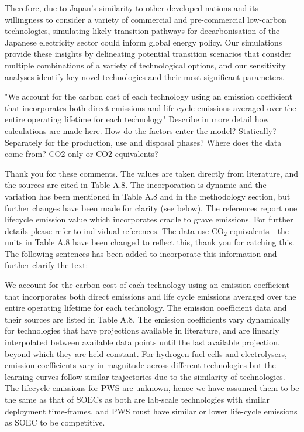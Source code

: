 \documentclass[answers,11pt]{exam}
\begin{document}
\begin{questions}
\begin{solution}
                Therefore, due to Japan's similarity to other developed nations and its willingness to consider a variety of commercial and pre-commercial low-carbon technologies, simulating likely transition pathways for decarbonisation of the Japanese electricity sector could inform global energy policy. Our simulations provide these insights by delineating potential transition scenarios that consider multiple combinations of a variety of technological options, and our sensitivity analyses identify key novel technologies and their most significant parameters.
        \end{solution}	
        
        
         \question "We account for the carbon cost of each technology using an emission coefficient that incorporates both direct emissions and life cycle emissions averaged over the entire operating lifetime for each technology"	
         Describe in more detail how calculations are made here. How do the factors enter the model? Statically? Separately for the production, use and disposal phases? Where does the data come from? CO2 only or CO2 equivalents? 
        
        \begin{solution}
                Thank you for these comments. The values are taken directly from literature, and the sources are cited in Table A.8. The incorporation is dynamic and the variation has been mentioned in Table A.8 and in the methodology section, but further changes have been made for clarity (see below). The references report one lifecycle emission value which incorporates cradle to grave emissions. For further details please refer to individual references. The data use CO$_2$ equivalents - the units in Table A.8 have been changed to reflect this, thank you for catching this. The following sentences has been added to incorporate this information and further clarify the text:
                
                We account for the carbon cost of each technology using an emission coefficient that incorporates both direct emissions and life cycle emissions averaged over the entire operating lifetime for each technology. The emission coefficient data and their sources are listed in Table A.8. The emission coefficients vary dynamically for technologies that have projections available in literature, and are linearly interpolated between available data points until the last available projection, beyond which they are held constant. For hydrogen fuel cells and electrolysers, emission coefficients vary in magnitude across different technologies but the learning curves follow similar trajectories due to the similarity of technologies. The lifecycle emissions for \gls{PWS} are unknown, hence we have assumed them to be the same as that of \glspl{SOEC} as both are lab-scale technologies with similar deployment time-frames, and \gls{PWS} must have similar or lower life-cycle emissions as \gls{SOEC} to be competitive.
                

\end{solution}
\end{questions}
\end{document}
